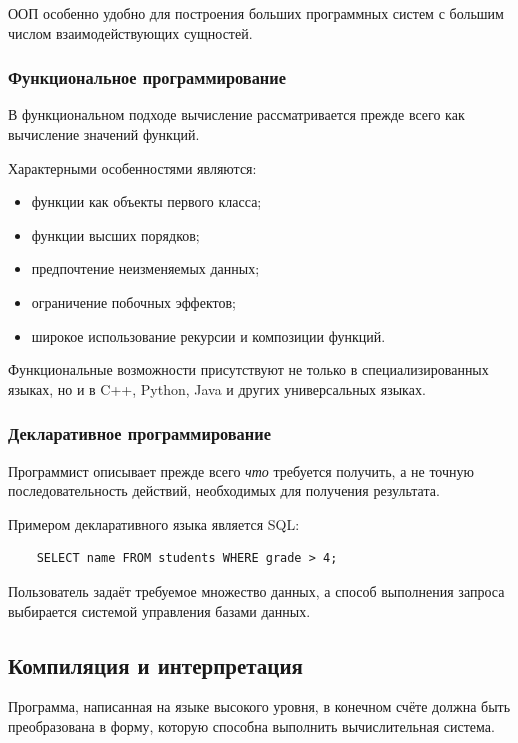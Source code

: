 ООП особенно удобно для построения больших программных систем с большим числом
взаимодействующих сущностей.

\subsubsection*{Функциональное программирование}

В функциональном подходе вычисление рассматривается прежде всего как
вычисление значений функций.

Характерными особенностями являются:

\begin{itemize}
	\item функции как объекты первого класса;
	\item функции высших порядков;
	\item предпочтение неизменяемых данных;
	\item ограничение побочных эффектов;
	\item широкое использование рекурсии и композиции функций.
\end{itemize}

Функциональные возможности присутствуют не только в специализированных
языках, но и в C++, Python, Java и других универсальных языках.

\subsubsection*{Декларативное программирование}

Программист описывает прежде всего \textit{что} требуется получить, а не
точную последовательность действий, необходимых для получения результата.

Примером декларативного языка является SQL:

\begin{verbatim}
	SELECT name FROM students WHERE grade > 4;
\end{verbatim}

Пользователь задаёт требуемое множество данных, а способ выполнения запроса
выбирается системой управления базами данных.

\subsection{Компиляция и интерпретация}

Программа, написанная на языке высокого уровня, в конечном счёте должна быть
преобразована в форму, которую способна выполнить вычислительная система.


